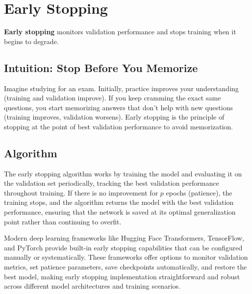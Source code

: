 
\section{Early Stopping }
\label{sec:early-stopping}

\textbf{Early stopping} monitors validation performance and stops training when it begins to degrade.

\subsection{Intuition: Stop Before You Memorize}

Imagine studying for an exam. Initially, practice improves your understanding (training and validation improve). If you keep cramming the exact same questions, you start memorizing answers that don't help with new questions (training improves, validation worsens). Early stopping is the principle of stopping at the point of best validation performance to avoid memorization.

\subsection{Algorithm}

The early stopping algorithm works by training the model and evaluating it on the validation set periodically, tracking the best validation performance throughout training. If there is no improvement for $p$ epochs (patience), the training stops, and the algorithm returns the model with the best validation performance, ensuring that the network is saved at its optimal generalization point rather than continuing to overfit.

\begin{remark}
Modern deep learning frameworks like Hugging Face Transformers, TensorFlow, and PyTorch provide built-in early stopping capabilities that can be configured manually or systematically. These frameworks offer options to monitor validation metrics, set patience parameters, save checkpoints automatically, and restore the best model, making early stopping implementation straightforward and robust across different model architectures and training scenarios.
\end{remark}

